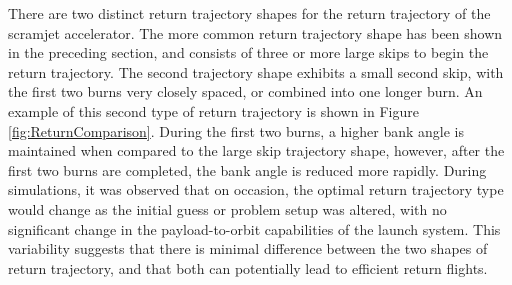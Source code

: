 There are two distinct return trajectory shapes for the return trajectory of the scramjet accelerator. The more common return trajectory shape has been shown in the preceding section, and consists of three or more large skips to begin the return trajectory. The second trajectory shape exhibits a small second skip, with the first two burns very closely spaced, or combined into one longer burn. An example of this second type of return trajectory is shown in Figure \ref{fig:ReturnComparison}. During the first two burns, a higher bank angle is maintained when compared to the large skip trajectory shape, however, after the first two burns are completed, the bank angle is reduced more rapidly. 
During simulations, it was observed that on occasion, the optimal return trajectory type would change as the initial guess or problem setup was altered, with no significant change in the payload-to-orbit capabilities of the launch system. This variability suggests that there is minimal difference between the two shapes of return trajectory, and that both can potentially lead to efficient return flights. 





